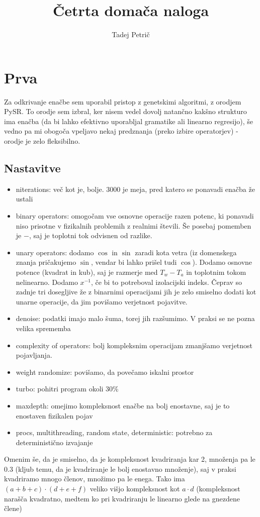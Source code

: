\documentclass{article}
\begin{document}
\title{Četrta domača naloga}
\author{Tadej Petrič}
\maketitle
\section{Prva}
Za odkrivanje enačbe sem uporabil pristop z genetskimi algoritmi, z orodjem PySR. To orodje sem izbral, ker nisem vedel dovolj natančno kakšno strukturo ima enačba (da bi lahko efektivno uporabljal gramatike ali linearno regresijo), še vedno pa mi obogoča vpeljavo nekaj predznanja (preko izbire operatorjev) - orodje je zelo fleksibilno.

\subsection*{Nastavitve}
\begin{itemize}
    \item niterations: več kot je, bolje. 3000 je meja, pred katero se ponavadi enačba že ustali
    \item binary operators: omogočam vse osnovne operacije razen potenc, ki ponavadi niso prisotne v fizikalnih problemih z realnimi števili. Še posebaj pomemben je \(-\), saj je toplotni tok odvisnen od razlike.
    \item unary operators: dodamo \(\cos\) in \(\sin\) zaradi kota vetra (iz domenskega znanja pričakujemo \(\sin\), vendar bi lahko prišel tudi \(\cos\)). Dodamo osnovne potence (kvadrat in kub), saj je razmerje med \(T_w-T_a\) in toplotnim tokom nelinearno. Dodamo \(x^{-1}\), če bi to potreboval izolacijski indeks. Čeprav so zadnje tri dosegljive že z binarnimi operacijami jih je zelo smiselno dodati kot unarne operacije, da jim povišamo verjetnost pojavitve.
    \item denoise: podatki imajo malo šuma, torej jih razšumimo. V praksi se ne pozna velika sprememba
    \item complexity of operators: bolj kompleksnim operacijam zmanjšamo verjetnost pojavljanja.
    \item weight randomize: povišamo, da povečamo iskalni prostor
    \item turbo: pohitri program okoli 30\%
    \item maxdepth: omejimo kompleksnost enačbe na bolj enostavne, saj je to enostaven fizikalen pojav
    \item procs, multithreading, random state, deterministic: potrebno za deterministično izvajanje
\end{itemize}
Omenim še, da je smiselno, da je kompleksnost kvadriranja kar 2, množenja pa le \(0.3\) (kljub temu, da je kvadriranje le bolj enostavno množenje), saj v praksi kvadriramo mnogo členov, množimo pa le enega. Tako ima \((a+b+c)\cdot(d+e+f)\) veliko višjo kompleksnost kot \(a\cdot d\) (kompleksnost narašča kvadratno, medtem ko pri kvadriranju le linearno glede na gnezdene člene)
\end{document}
